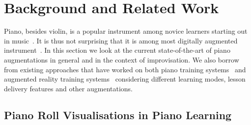 \documentclass{vgtc}                          %
\begin{document}
\section{Background and Related Work}
\label{sec:rrl}
\par Piano, besides violin, is a popular instrument among novice learners starting out in music~\cite{ericsson1993role}. It is thus not surprising that it is among most digitally augmented instrument~\cite{deja2022piano}. In this section %
we look at the current state-of-the-art of %
piano augmentations in general and %
in the context of improvisation. %
We also borrow from existing approaches that have worked on both piano training systems~\cite{deja2022survey} and augmented reality training systems~\cite{santos2013augmented} considering different learning modes, lesson delivery features and other augmentations. 

\subsection{Piano Roll Visualisations in Piano Learning}
\end{document}
